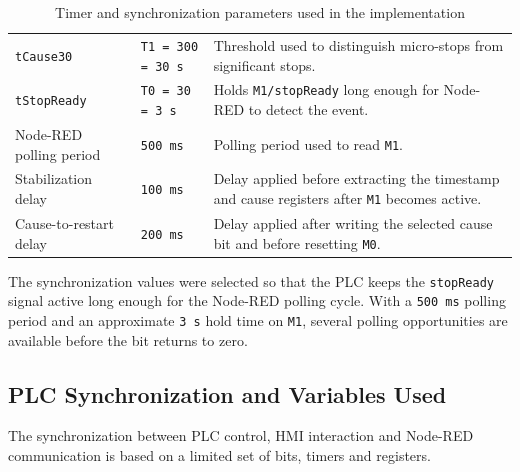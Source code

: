 \begin{table}[H]
\centering
\caption{Timer and synchronization parameters used in the implementation}
\begin{tabularx}{\textwidth}{|P{0.22\textwidth}|P{0.20\textwidth}|Y|}
\hline
{}
 &  &  \\
\hline
\texttt{tCause30} & \texttt{T1 = 300 = 30 s} & Threshold used to distinguish micro-stops from significant stops. \\
\hline
\texttt{tStopReady} & \texttt{T0 = 30 = 3 s} & Holds \texttt{M1/stopReady} long enough for Node-RED to detect the event. \\
\hline
Node-RED polling period & \texttt{500 ms} & Polling period used to read \texttt{M1}. \\
\hline
Stabilization delay & \texttt{100 ms} & Delay applied before extracting the timestamp and cause registers after \texttt{M1} becomes active. \\
\hline
Cause-to-restart delay & \texttt{200 ms} & Delay applied after writing the selected cause bit and before resetting \texttt{M0}. \\
\hline
\end{tabularx}
\end{table}

The synchronization values were selected so that the PLC keeps the \texttt{stopReady} signal active long enough for the Node-RED polling cycle. With a \texttt{500 ms} polling period and an approximate \texttt{3 s} hold time on \texttt{M1}, several polling opportunities are available before the bit returns to zero.

\subsection{PLC Synchronization and Variables Used}
The synchronization between PLC control, HMI interaction and Node-RED communication is based on a limited set of bits, timers and registers.

